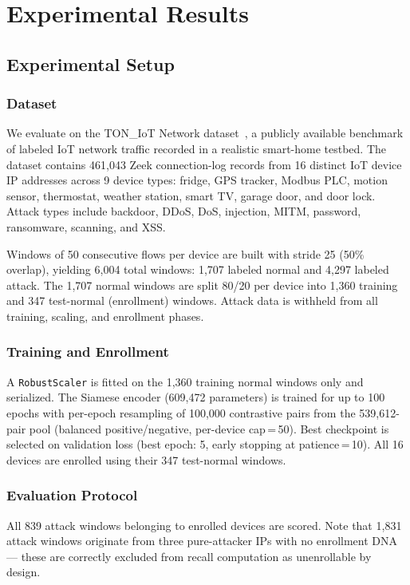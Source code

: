 \documentclass[journal,10pt,twoside]{IEEEtran}
\begin{document}
\section{Experimental Results}
\label{sec:results}

\subsection{Experimental Setup}

\subsubsection{Dataset}
We evaluate on the TON\_IoT Network dataset~\cite{alsaedi2020toniot},
a publicly available benchmark of labeled IoT network traffic recorded in a
realistic smart-home testbed.
The dataset contains 461{,}043 Zeek connection-log records from 16 distinct
IoT device IP addresses across 9 device types: fridge, GPS tracker, Modbus
PLC, motion sensor, thermostat, weather station, smart TV, garage door, and
door lock.
Attack types include backdoor, DDoS, DoS, injection, MITM, password,
ransomware, scanning, and XSS.

Windows of 50 consecutive flows per device are built with stride 25 (50\%
overlap), yielding 6{,}004 total windows: 1{,}707 labeled normal and 4{,}297
labeled attack.
The 1{,}707 normal windows are split 80/20 per device into 1{,}360 training
and 347 test-normal (enrollment) windows.
Attack data is withheld from all training, scaling, and enrollment phases.

\subsubsection{Training and Enrollment}
A \texttt{RobustScaler} is fitted on the 1{,}360 training normal windows only
and serialized.
The Siamese encoder (609{,}472 parameters) is trained for up to 100 epochs
with per-epoch resampling of 100{,}000 contrastive pairs from the
539{,}612-pair pool (balanced positive/negative, per-device cap\,=\,50).
Best checkpoint is selected on validation loss (best epoch: 5, early stopping
at patience\,=\,10).
All 16 devices are enrolled using their 347 test-normal windows.

\subsubsection{Evaluation Protocol}
All 839 attack windows belonging to enrolled devices are scored.
Note that 1{,}831 attack windows originate from three pure-attacker IPs
with no enrollment DNA --- these are correctly excluded from recall
computation as unenrollable by design.
\end{document}
